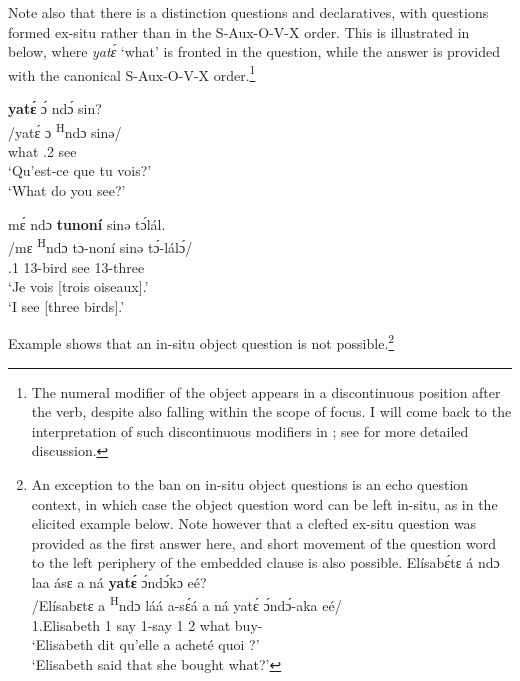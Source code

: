 \documentclass[output=paper,colorlinks,citecolor=brown
]{langscibook}
\begin{document}
\z
\z


Note also that there is a distinction questions and declaratives, with questions formed ex-situ rather than in the S-Aux-O-V-X order. This is illustrated in  below, where \textit{yatɛ́} `what' is fronted in the question, while the answer is provided with the canonical S-Aux-O-V-X order.\footnote{The numeral modifier of the object appears in a discontinuous position after the verb, despite also falling within the scope of focus. I will come back to the interpretation of such discontinuous modifiers in ; see \citet[Chapter 7]{KerrFut} for more detailed discussion.}

\ea \label{whatseeQA}
\begin{xlist}
\glll
{\db}\textbf{yatɛ́} ɔ́ ndɔ́ sin? \\
/yatɛ́ ɔ \textsuperscript{H}ndɔ	sinə/ \\
{\db}what	\SM{}.2\SG{} \PRS{}	see \\
\glt
`Qu'est-ce que tu vois?' \\ `What do you see?' \jambox*{[EO 396] }
\end{xlist}

\begin{xlist}
\glll
{\db}mɛ́ ndɔ	\textbf{tunoní}	sinə tɔ́lál. \\
/mɛ \textsuperscript{H}ndɔ tɔ-noní sinə tɔ́-lálɔ́/ \\
{\db}\SM{}.1\SG{} \PRS{}	13-bird	see	13-three \\
\glt
`Je vois [trois oiseaux]\textsubscript{\FOC{}}.' \\ `I see [three birds]\textsubscript{\FOC{}}.' \jambox*{[EO 397]}
\end{xlist}
\z

Example  shows that an in-situ object question is not possible.\footnote{An exception to the ban on in-situ object questions is an echo question context, in which case the object question word can be left in-situ, as in the elicited example  below. Note however that a clefted ex-situ question was provided as the first answer here, and short movement of the question word to the left periphery of the embedded clause is also possible.
\ea
\label{echoQ}
\glll
{\db}Elísabɛ́tɛ	á ndɔ	laa	ásɛ	a ná \textbf{yatɛ́}	ɔ́ndɔ́kɔ	eé? \\
/Elísabɛtɛ	a \textsuperscript{H}ndɔ	láá	a-sɛ́á	a ná yatɛ́	ɔ́ndɔ́-aka	eé/ \\
{\db}1.Elisabeth 1\SM{} \PRS{} say 1\SM{}-say 1\SM{} \PST{}2{} what buy-\DUR{} \Q{} \\
\glt
`Elisabeth dit qu'elle a acheté quoi ?' \\ `Elisabeth said that she bought what?' 
\z
}
\end{document}
